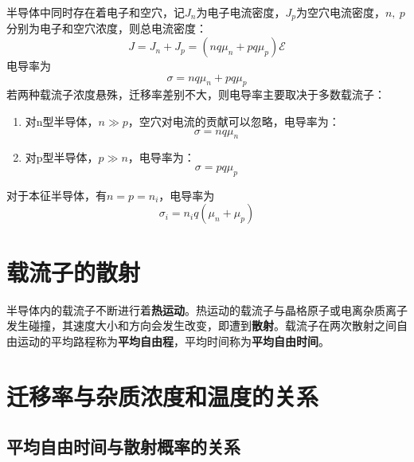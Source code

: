 半导体中同时存在着电子和空穴，记$J_n$为电子电流密度，$J_p$为空穴电流密度，$n,\ p$分别为电子和空穴浓度，则总电流密度：
\begin{equation}
    J=J_n+J_p=\left(nq\mu_n+pq\mu_p\right)\mathscr{E}
\end{equation}
电导率为
\begin{equation}
    \sigma=nq\mu_n+pq\mu_p
\end{equation}
若两种载流子浓度悬殊，迁移率差别不大，则电导率主要取决于多数载流子：
\begin{enumerate}
    \item 对n型半导体，$n\gg p$，空穴对电流的贡献可以忽略，电导率为：
    \begin{equation}
        \sigma=nq\mu_n
    \end{equation}
    \item 对p型半导体，$p\gg n$，电导率为：
    \begin{equation}
        \sigma=pq\mu_p
    \end{equation}
\end{enumerate}
对于本征半导体，有$n=p=n_i$，电导率为
\begin{equation}
    \sigma_i=n_iq(\mu_n+\mu_p)
\end{equation}

\section{载流子的散射}

半导体内的载流子不断进行着\textbf{热运动}。热运动的载流子与晶格原子或电离杂质离子发生碰撞，其速度大小和方向会发生改变，即遭到\textbf{散射}。载流子在两次散射之间自由运动的平均路程称为\textbf{平均自由程}，平均时间称为\textbf{平均自由时间}。

\section{迁移率与杂质浓度和温度的关系}

\subsection{平均自由时间与散射概率的关系}

